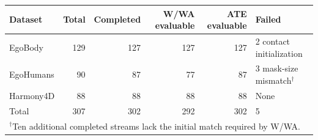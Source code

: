 \begin{tabular}{lrrrrl}
  \toprule
  Dataset & Total & Completed & W/WA evaluable & ATE evaluable & Failed \\
  \midrule
  EgoBody & 129 & 127 & 127 & 127 & 2 contact initialization \\
  EgoHumans & 90 & 87 & 77 & 87 & 3 mask-size mismatch$^\dagger$ \\
  Harmony4D & 88 & 88 & 88 & 88 & None \\
  \midrule
  Total & 307 & 302 & 292 & 302 & 5 \\
  \bottomrule
  \multicolumn{6}{l}{\footnotesize $^\dagger$Ten additional completed streams lack the initial match required by W/WA.} \\
\end{tabular}

